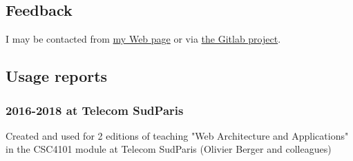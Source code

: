 \documentclass[a4paper]{article}
\begin{document}
\subsection{Feedback}
\label{sec:org5545537}

I may be contacted from \href{http://www-public.tem-tsp.eu/\~berger\_o/\#sec-3}{my Web page} or via \href{https://gitlab.com/olberger/org-teaching}{the Gitlab project}.

\subsection{Usage reports}
\label{sec:org00dfbca}

\subsubsection{2016-2018 at Telecom SudParis}
\label{sec:org112155b}

Created and used for 2 editions of teaching "Web Architecture and Applications" in the CSC4101 module at Telecom SudParis (Olivier Berger and colleagues)
\end{document}

